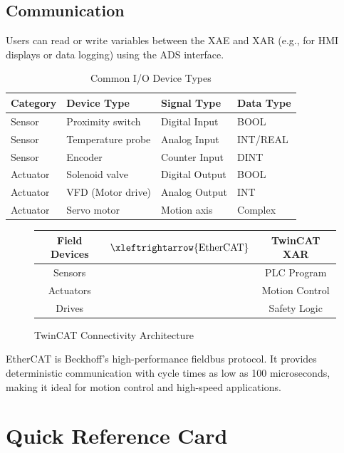 \documentclass[11pt,a4paper]{article}
\begin{document}
\subsection{Communication}

Users can read or write variables between the XAE and XAR (e.g., for HMI displays or data logging) using the ADS interface.

\begin{table}[h]
\centering
\begin{tabular}{@{}llll@{}}
\toprule
\textbf{Category} & \textbf{Device Type} & \textbf{Signal Type} & \textbf{Data Type} \\
\midrule
Sensor & Proximity switch & Digital Input & BOOL \\
Sensor & Temperature probe & Analog Input & INT/REAL \\
Sensor & Encoder & Counter Input & DINT \\
Actuator & Solenoid valve & Digital Output & BOOL \\
Actuator & VFD (Motor drive) & Analog Output & INT \\
Actuator & Servo motor & Motion axis & Complex \\
\bottomrule
\end{tabular}
\caption{Common I/O Device Types}
\end{table}

\begin{figure}[h]
\centering
\begin{tabular}{|c|c|c|}
\hline
\textbf{Field Devices} & $\xleftrightarrow{\text{EtherCAT}}$ & \textbf{TwinCAT XAR} \\
\hline
Sensors & & PLC Program \\
Actuators & & Motion Control \\
Drives & & Safety Logic \\
\hline
\end{tabular}
\caption{TwinCAT Connectivity Architecture}
\end{figure}

\begin{tipbox}
EtherCAT is Beckhoff's high-performance fieldbus protocol. It provides deterministic communication with cycle times as low as 100 microseconds, making it ideal for motion control and high-speed applications.
\end{tipbox}

\section*{Quick Reference Card}
\end{document}

